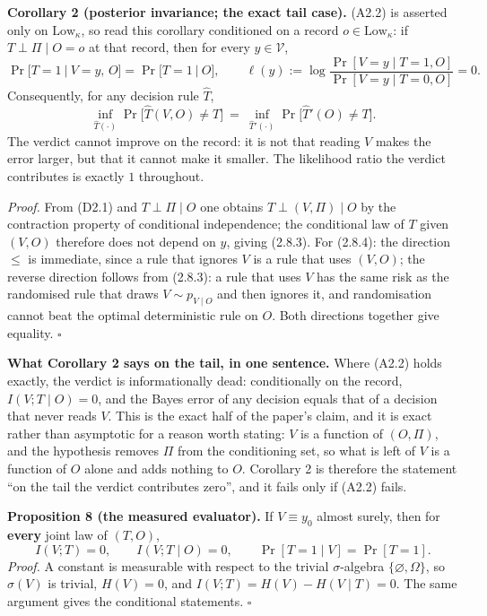 \documentclass[11pt,a4paper]{article}
\begin{document}
\textbf{Corollary 2 (posterior invariance; the exact tail case).} (A2.2) is asserted
only on \(\mathrm{Low}_\kappa\), so read this corollary conditioned on a record
\(o\in\mathrm{Low}_\kappa\): if \(T\perp\Pi\mid O=o\) at that record, then for every
\(y\in\mathcal V\),
\begin{equation}
\Pr\big[T=1\ \big|\ V=y,\,O\big]=\Pr\big[T=1\ \big|\ O\big],
\qquad
\ell(y):=\log\frac{\Pr[V=y\mid T=1,O]}{\Pr[V=y\mid T=0,O]}=0 .
\tag{2.8.3}
\end{equation}
Consequently, for any decision rule \(\hat T\),
\begin{equation}
\inf_{\hat T(\cdot)}\Pr\big[\hat T(V,O)\ne T\big]
\ =\
\inf_{\hat T'(\cdot)}\Pr\big[\hat T'(O)\ne T\big].
\tag{2.8.4}
\end{equation}
The verdict cannot improve on the record: it is not that reading \(V\) makes the
error larger, but that it cannot make it smaller. The likelihood ratio the verdict
contributes is exactly \(1\) throughout.

\emph{Proof.} From (D2.1) and \(T\perp\Pi\mid O\) one obtains \(T\perp(V,\Pi)\mid O\) by
the contraction property of conditional independence; the conditional law of \(T\)
given \((V,O)\) therefore does not depend on \(y\), giving (2.8.3). For (2.8.4): the
direction \(\le\) is immediate, since a rule that ignores \(V\) is a rule that uses
\((V,O)\); the reverse direction follows from (2.8.3): a rule that uses \(V\) has the
same risk as the randomised rule that draws \(V\sim p_{V\mid O}\) and then ignores
it, and randomisation cannot beat the optimal deterministic rule on \(O\). Both
directions together give equality. \(\square\)

\textbf{What Corollary 2 says on the tail, in one sentence.} Where (A2.2) holds exactly,
the verdict is informationally dead: conditionally on the record,
\(I(V;T\mid O)=0\), and the Bayes error of any decision equals that of a decision
that never reads \(V\). This is the exact half of the paper's claim, and it is exact
rather than asymptotic for a reason worth stating: \(V\) is a function of \((O,\Pi)\),
and the hypothesis removes \(\Pi\) from the conditioning set, so what is left of \(V\)
is a function of \(O\) alone and adds nothing to \(O\). Corollary 2 is therefore the
statement ``on the tail the verdict contributes zero'', and it fails only if (A2.2)
fails.

\textbf{Proposition 8 (the measured evaluator).} If \(V\equiv y_0\) almost surely, then
for \textbf{every} joint law of \((T,O)\),
\begin{equation}
I(V;T)=0,
\qquad
I(V;T\mid O)=0,
\qquad
\Pr[T=1\mid V]=\Pr[T=1].
\tag{2.8.5}
\end{equation}
\emph{Proof.} A constant is measurable with respect to the trivial \(\sigma\)-algebra
\(\{\varnothing,\Omega\}\), so \(\sigma(V)\) is trivial, \(H(V)=0\), and
\(I(V;T)=H(V)-H(V\mid T)=0\). The same argument gives the conditional statements.
\(\square\)
\end{document}
